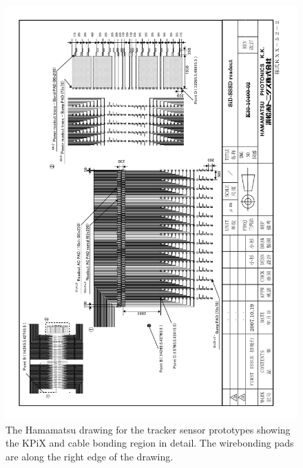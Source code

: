 \documentclass[prc,12pt,nofootinbib,letterpaper]{revtex4}
\begin{document}
\begin{figure}[p]
\begin{center}
    \includegraphics[width=6in]{figures/SiD-SSSD readout}
\caption{The Hamamatsu drawing for the tracker sensor prototypes showing the KPiX and cable bonding region in detail.  The wirebonding pads are along the right edge of the drawing.}
\label{fig:drawing-readout}
\end{center}
\end{figure}
\end{document}
